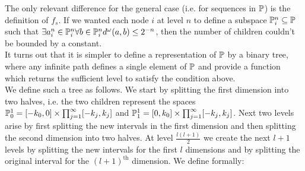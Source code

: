 %
The only relevant difference for the general case (i.e. for sequences in 
$\mathbb{P}$) is the definition
of $f_s$. If we wanted each node $i$ at level $n$ to define a subspace 
$\mathbb{P}^n_i\subseteq\mathbb{P}$ such that
$\exists a^n_i\in\mathbb{P}^n_i\forall b\in\mathbb{P}^n_i d^\omega(a,b)\leq2^{-n}$, then 
the number of children couldn't be bounded by a constant. \\
It turns out that it is simpler to define a representation of $\mathbb{P}$ by a 
binary tree, where any infinite path defines a single
element of $\mathbb{P}$ and provide a function which returns the sufficient level 
to satisfy the condition above. \\
We define such a tree as follows. We start by splitting the first dimension 
into two halves, i.e. the two children represent the spaces 
$\mathbb{P}^1_0=[-k_0,0]\times\prod_{j=1}^\infty[-k_j,k_j]$ and 
$\mathbb{P}^1_1=[0,k_0]\times\prod_{j=1}^\infty[-k_j,k_j]$. Next two levels arise 
by first splitting the new intervals in the first dimension and then 
splitting the second dimension into two halves. At level $\frac{l(l+1)}{2}$ 
we create the next $l+1$ levels by splitting the new intervals for the first 
$l$ dimensions and by splitting the original interval for the 
$(l+1)^\text{th}$ dimension. We define formally:
\renewcommand{\l}{\ensuremath{\mathrm {lv}}}

